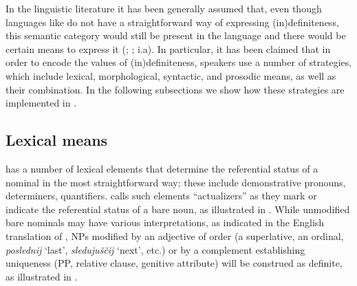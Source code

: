\documentclass[output=paper,
colorlinks,
citecolor=brown,
newtxmath
]{langscibook}
\begin{document}
In the linguistic literature it has been generally assumed that, even though languages like  do not have a straightforward way of expressing (in)defi\-nite\-ness, this semantic category would still be present in the language and there would be certain means to express it (\citealt{GalkinaFedoruk1963}; \citealt{Pospelov1970}; i.a). %
In particular, it has been claimed
that in order to encode the values of (in)defi\-nite\-ness,  speakers use a number of strategies, which include lexical, %
morphological, syntactic, and prosodic means, as well as %
their combination. In the following subsections we show how these strategies are implemented in .

\subsection{Lexical means}
 has a number of lexical elements that determine the referential status of a nominal in the most straightforward way; these include demonstrative pronouns, determiners, quantifiers. \citet{Paduceva1985} calls such elements ``actualizers'' as they mark or indicate the referential status of a bare noun, as illustrated in . While unmodified bare nominals may have various interpretations, as indicated in the English translation of
, NPs modified by an adjective of order (a superlative, an ordinal, \textit{poslednij} `last', \textit{sledujuščij}  `next', etc.) %
or by a complement establishing uniqueness (PP, relative clause, genitive attribute) %
will be construed as definite, as illustrated in .

\end{document}
